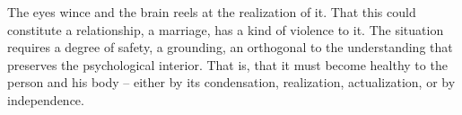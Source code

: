 

The eyes wince and the brain reels at the realization of it.  That
this could constitute a relationship, a marriage, has a kind of
violence to it.  The situation requires a degree of safety, a
grounding, an orthogonal to the understanding that preserves the
psychological interior.  That is, that it must become healthy to the
person and his body -- either by its condensation, realization,
actualization, or by independence.

\bye
